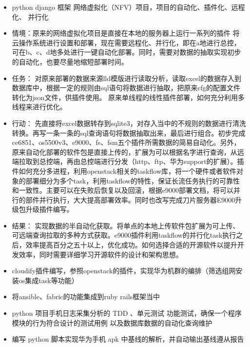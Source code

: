 \documentclass{resume}
\begin{document}
\begin{itemize}
  \item python django 框架 网络虚拟化（NFV）项目，项目的自动化、插件化、远程化、 并行化 
  \item 情境：原来的网络虚拟化项目是直接在本地的服务器上运行一系列的插件 将云操作系统进行设置和部署，现在需要远程化、并行化，即在a地进行总控，可在b、c、d地多处进行一键自动化部署。同时，需要对数据的抽取实现初步的自动化，也要尽量地缩短部署时间。
  \item 任务： 对原来部署的数据来源lld模版进行读取分析，读取excel的数据存入到数据库中，根据一定的规则由sql语句将数据进行抽取，把原来cfg的配置文件转化为json文件，供插件使用。
  原来单线程的线性插件部署，如何充分利用多线程来进行优化。
  \item 行动： 先直接将excel数据转存到sqlite3，对存入当中的不规则的数据进行清洗转换。再写一条一条的sql查询语句将数据抽取出来，最后进行组合。初步完成ce6851、os5500v3、e9000、fs、fsm五个插件所需数据的简易自动化。另外，原来自动化部署的软件包是直接上传的，扩展为可以根据名字进行查询，从远端拉取到总控端，再由总控端进行分发（http、ftp、华为support的扩展）。插件如何充分多进程，利用openstack相关的taskflow库，将一个硬件或者软件对象的部署细分为多个task，利用taskflow的特性，保证长流任务执行的可靠性和一致性。主要可以在失败后恢复以及回滚，根据e9000部署文档，将可以并行的部件并行执行，大大提高部署效率。同时也改写完成刀片服务器E9000升级包升级插件编写。
  \item 结果： 实现数据的半自动化获取。将单点的本地上传软件包扩展为可上传、可远端查询拉取的多种方式获取。e9000插件利用taskflow的并行化task执行之后，效率提高百分之五十以上，优化成功。如何选择合适的开源软件以提升开发效率，同时需要详细学习开源软件的设计和架构思想。
\end{itemize}


\begin{itemize}
  \item cloudify插件编写，参照openstack的插件，实现华为机群的编排（筛选组网安装os集成task等功能）
  \item 将ansible、fabric的功能集成到ruby rails框架当中
\end{itemize}


\begin{itemize}
  \item python 项目手机日志采集分析的 TDD 、单元测试 功能测试，确保一个程序模块的行为符合设计的测试用例 以及数据库数据的自动化查询维护
  \item 编写 python 脚本实现华为手机 apk 中基线的解析，并自动输出基线遵从报告
\end{itemize}
\end{document}
